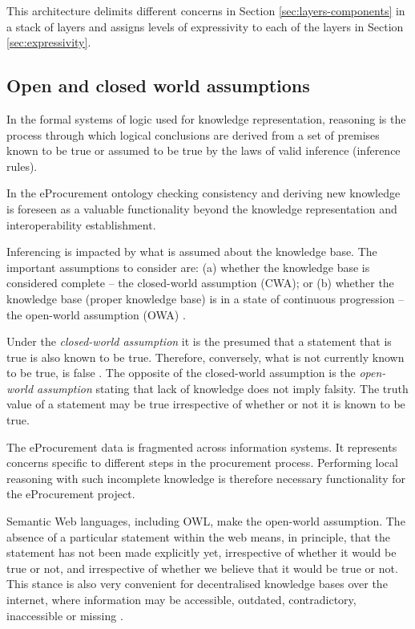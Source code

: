 	This architecture delimits different concerns in Section \ref{sec:layers-components} in a stack of layers and assigns levels of expressivity to each of the layers in Section \ref{sec:expressivity}.
	
	\subsection{Open and closed world assumptions}
	\label{sec:world-assumption}
	
	In the formal systems of logic used for knowledge representation, reasoning is the process through which logical conclusions are derived from a set of premises known to be true or assumed to be true by the laws of valid inference (inference rules). 
	
	In the eProcurement ontology checking consistency and deriving new knowledge is foreseen as a valuable functionality beyond the knowledge representation and interoperability establishment.
	
	Inferencing is impacted by what is assumed about the knowledge base. The important assumptions to consider are: (a) whether the knowledge base is considered complete -- the closed-world assumption (CWA); or (b) whether the knowledge base (proper knowledge base) is in a state of continuous progression -- the open-world assumption (OWA) \cite{damasio2006supporting}.
	
	Under the \textit{closed-world assumption} it is the presumed that a statement that is true is also known to be true. Therefore, conversely, what is not currently known to be true, is false \citep{reiter1981closed}.
	The opposite of the closed-world assumption is the \textit{open-world assumption} stating that lack of knowledge does not imply falsity. The truth value of a statement may be true irrespective of whether or not it is known to be true. 
		
	The eProcurement data is fragmented across information systems. It represents concerns specific to different steps in the procurement process. Performing local reasoning with such incomplete knowledge is therefore necessary functionality for the eProcurement project. 
		
	Semantic Web languages, including OWL, make the open-world assumption. The absence of a particular statement within the web means, in principle, that the statement has not been made explicitly yet, irrespective of whether it would be true or not, and irrespective of whether we believe that it would be true or not. This stance is also very convenient for decentralised knowledge bases over the internet, where information may be accessible, outdated, contradictory, inaccessible or missing \cite{damasio2006supporting}. 
	
